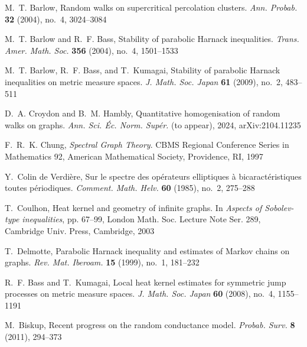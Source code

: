 \documentclass{article}
\numberwithin{equation}{section}
\theoremstyle{definition}
\theoremstyle{remark}
\begin{document}
\begin{thebibliography}{99}

M.~T. Barlow, Random walks on supercritical percolation clusters.
\emph{Ann. Probab.} \textbf{32} (2004), no.~4, 3024--3084

M.~T. Barlow and R.~F. Bass, Stability of parabolic Harnack inequalities.
\emph{Trans. Amer. Math. Soc.} \textbf{356} (2004), no.~4, 1501--1533

M.~T. Barlow, R.~F. Bass, and T.~Kumagai, Stability of parabolic Harnack inequalities on metric measure spaces.
\emph{J. Math. Soc. Japan} \textbf{61} (2009), no.~2, 483--511

D.~A. Croydon and B.~M. Hambly, Quantitative homogenisation of random walks on graphs.
\emph{Ann. Sci. Éc. Norm. Supér.} (to appear), 2024, arXiv:2104.11235

F.~R.~K. Chung, \emph{Spectral Graph Theory}.
CBMS Regional Conference Series in Mathematics 92, American Mathematical Society, Providence, RI, 1997

Y.~Colin de Verdière, Sur le spectre des opérateurs elliptiques à bicaractéristiques toutes périodiques.
\emph{Comment. Math. Helv.} \textbf{60} (1985), no.~2, 275--288

T.~Coulhon, Heat kernel and geometry of infinite graphs.
In \emph{Aspects of Sobolev-type inequalities},
pp. 67--99, London Math. Soc. Lecture Note Ser. 289,
Cambridge Univ. Press, Cambridge, 2003

T.~Delmotte, Parabolic Harnack inequality and estimates of Markov chains on graphs.
\emph{Rev. Mat. Iberoam.} \textbf{15} (1999), no.~1, 181--232

R.~F. Bass and T.~Kumagai, Local heat kernel estimates for symmetric jump processes on metric measure spaces.
\emph{J. Math. Soc. Japan} \textbf{60} (2008), no.~4, 1155--1191

M.~Biskup, Recent progress on the random conductance model.
\emph{Probab. Surv.} \textbf{8} (2011), 294--373


\end{thebibliography}
\end{document}
